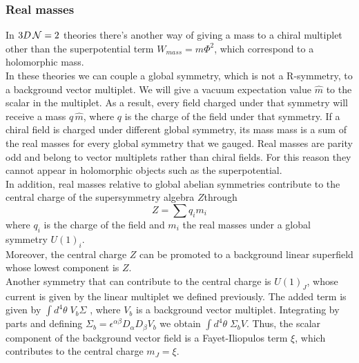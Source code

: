 \subsubsection{Real masses}

In $3 D \, \mathcal{N}=2$ theories there's another way of giving a mass to a chiral multiplet other than the superpotential term $W_{mass}= m \Phi^2$, which correspond to a holomorphic mass.\\
In these theories we can couple a global symmetry, which is not a R-symmetry, to a background vector multiplet.
We will give a vacuum expectation value $\hat{m} $ to the scalar in the multiplet.
As a result, every field charged under that symmetry will receive a mass $q \, \hat{m}$, where $q$ is the charge of the field under that symmetry.
If a chiral field is charged under different global symmetry, its mass  mass is a sum of the real masses for every global symmetry that we gauged.
Real masses are parity odd and belong to vector multiplets rather than chiral fields. For this reason they cannot appear in holomorphic objects such as the superpotential.\\
In addition, real masses relative to global abelian symmetries contribute to the central charge of the supersymmetry algebra $Z$through
\begin{equation}
  Z = \sum q_i m_i
 \end{equation} 
 where $q_i$ is the charge of the field and $m_i$ the real masses under a global symmetry $U(1)_i$.\\
 Moreover, the central charge $Z$ can be promoted to a background linear superfield whose lowest component is $Z$.\\
 Another symmetry that can contribute to the central charge is $U(1)_J$, whose current is given by the linear multiplet we defined previously.
 The added term is given by $\int d^4 \theta \; V_b \Sigma $ , where $V_b$ is a background vector multiplet.
 Integrating by parts and defining  $\Sigma_b = \epsilon^{\alpha \beta} D_{\alpha} D_{\beta} V_b$ we obtain $\int d^4 \theta \; \Sigma_b V  $.
 Thus, the scalar component of the background vector field is a Fayet-Iliopulos term $\xi$, which contributes to the central charge $m_J = \xi $.

 
 
